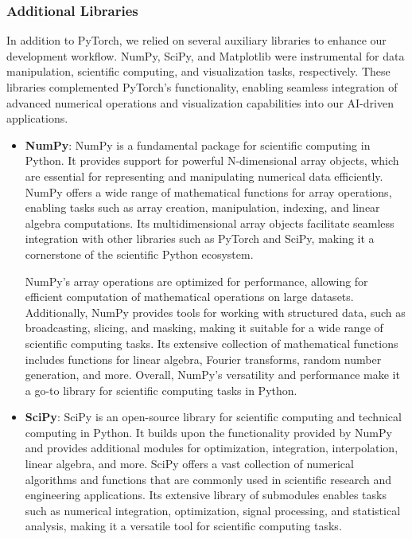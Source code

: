   \subsubsection{Additional Libraries}
  In addition to PyTorch, we relied on several auxiliary libraries to enhance our development workflow. NumPy, SciPy, and Matplotlib were instrumental for data manipulation, scientific computing, and visualization tasks, respectively. These libraries complemented PyTorch's functionality, enabling seamless integration of advanced numerical operations and visualization capabilities into our AI-driven applications.
  \begin{itemize}
    \item \textbf{NumPy}: NumPy is a fundamental package for scientific computing in Python. It provides support for powerful N-dimensional array objects, which are essential for representing and manipulating numerical data efficiently. NumPy offers a wide range of mathematical functions for array operations, enabling tasks such as array creation, manipulation, indexing, and linear algebra computations. Its multidimensional array objects facilitate seamless integration with other libraries such as PyTorch and SciPy, making it a cornerstone of the scientific Python ecosystem.
    
    NumPy's array operations are optimized for performance, allowing for efficient computation of mathematical operations on large datasets. Additionally, NumPy provides tools for working with structured data, such as broadcasting, slicing, and masking, making it suitable for a wide range of scientific computing tasks. Its extensive collection of mathematical functions includes functions for linear algebra, Fourier transforms, random number generation, and more. Overall, NumPy's versatility and performance make it a go-to library for scientific computing tasks in Python.
    
    \item \textbf{SciPy}: SciPy is an open-source library for scientific computing and technical computing in Python. It builds upon the functionality provided by NumPy and provides additional modules for optimization, integration, interpolation, linear algebra, and more. SciPy offers a vast collection of numerical algorithms and functions that are commonly used in scientific research and engineering applications. Its extensive library of submodules enables tasks such as numerical integration, optimization, signal processing, and statistical analysis, making it a versatile tool for scientific computing tasks.
    

\end{itemize}
